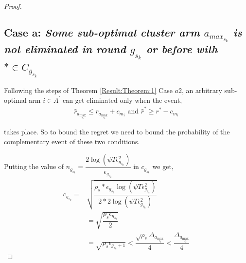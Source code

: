 \begin{proof}
\subsection*{Case a: \textit{ Some sub-optimal cluster arm $a_{max_{s_{k}}}$ is not eliminated in round $g_{s_{k}}$ or before with $* \in C_{g_{s_{k}}}$ }}

  
	Following the steps of Theorem \ref{Result:Theorem:1} Case $a2$, an arbitrary sub-optimal arm ${i}\in A^{'}$ can get eliminated only when the event,
	\begin{align}
	\hat{r}_{a_{\max_{s_{k}}}}  \le r_{a_{\max_{s_{k}}}} + c_{m_{i}} \text{ and } \label{eq:appB:armelim-casea}
 	\hat{r}^{*}\geq  r^{*} - c_{m_{i}}
	\end{align}
	
	takes place. So to bound the regret we need to bound the probability of the complementary event of these two conditions.  
  
  
  Putting the value of $n_{g_{s_{k}}}=\dfrac{2\log{(\psi T\epsilon_{g_{s_{k}}}^{2})}}{\epsilon_{g_{s_{k}}}}$ in $c_{g_{s_{k}}}$ we get,
  \begin{align*}
  c_{g_{s_{k}}}= & \sqrt{\dfrac{\rho_{s}*\epsilon_{g_{s_{k}}}\log (\psi  T\epsilon_{g_{s_{k}}}^{2})}{2*2 \log(\psi T\epsilon_{g_{s_{k}}}^{2})}}\\
  &=\sqrt{\dfrac{\rho_{s}\epsilon_{g_{s_{k}}}}{2}}\\
  &=\sqrt{\rho_{s}\epsilon_{g_{s_{k}}+1}} < \dfrac{\sqrt{\rho_{s}}\Delta_{a_{\max_{s_{k}}}}}{4} < \dfrac{\Delta_{a_{\max_{s_{k}}}}}{4}
  \end{align*}


\end{proof}
